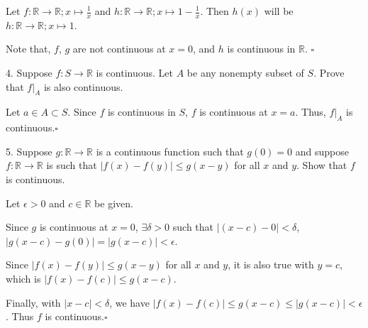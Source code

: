\documentclass{article}
\begin{document}
Let $f: \mathbb{R} \rightarrow \mathbb{R}; x \mapsto \frac{1}{x}$ and $h: \mathbb{R} \rightarrow\mathbb{R}; x\mapsto 1-\frac{1}{x}$. Then $h(x)$ will be $h: \mathbb{R}\rightarrow\mathbb{R}; x\mapsto 1$.

Note that, $f$, $g$ are not continuous at $x=0$, and $h$ is continuous in $\mathbb{R}$. $\square$

4. Suppose $f: S \rightarrow \mathbb{R}$ is continuous. Let $A$ be any nonempty subset of $S$. Prove that $f|_{A}$ is also continuous.

Let $a \in A \subset S$. Since $f$ is continuous in $S$, $f$ is continuous at $x=a$. Thus, $f|_{A}$ is continuous.$\square$

5. Suppose $g: \mathbb{R}\rightarrow\mathbb{R}$ is a continuous function such that $g(0) = 0$ and suppose $f: \mathbb{R} \rightarrow\mathbb{R}$ is such that $|f(x)-f(y)| \le g(x-y)$ for all $x$ and $y$. Show that $f$ is continuous.

Let $\epsilon >0$ and $c \in \mathbb{R}$ be given. 

Since $g$ is continuous at $x=0$, $\exists \delta > 0$ such that $|(x-c)-0|<\delta$, $|g(x-c)-g(0)| = |g(x-c)| < \epsilon$.

Since $|f(x)-f(y)| \le g(x-y)$ for all $x$ and $y$,  it is also true with $y = c$, which is $|f(x)-f(c)| \le g(x-c)$.

Finally, with $|x-c|<\delta$, we have $|f(x)-f(c)| \le g(x-c) \le |g(x-c)| < \epsilon$. Thus $f$ is continuous.$\square$
\end{document}
